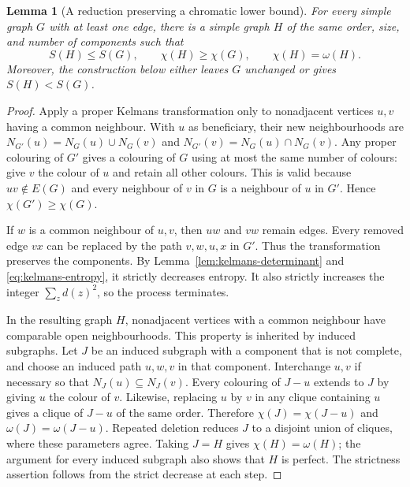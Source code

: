 \documentclass[11pt,a4paper,reqno]{amsart}
\newtheorem{lemma}[theorem]{Lemma}
\theoremstyle{remark}
\newcommand{\Ent}{S}
\numberwithin{equation}{section}
\begin{document}
\begin{lemma}[A reduction preserving a chromatic lower bound]
\label{lem:chromatic-reduction}
For every simple graph $G$ with at least one edge, there is a simple graph
$H$ of the same order, size, and number of components such that
\[
 \Ent(H)\le\Ent(G),\qquad
 \chi(H)\ge\chi(G),\qquad \chi(H)=\omega(H).
\]
Moreover, the construction below either leaves $G$ unchanged or gives
$\Ent(H)<\Ent(G)$.
\end{lemma}
\begin{proof}
Apply a proper Kelmans transformation only to nonadjacent vertices
$u,v$ having a common neighbour. With $u$ as beneficiary, their new
neighbourhoods are
$N_{G'}(u)=N_G(u)\cup N_G(v)$ and
$N_{G'}(v)=N_G(u)\cap N_G(v)$.
Any proper colouring of $G'$ gives a colouring of $G$ using at most the
same number of colours: give $v$ the colour of $u$ and retain all other
colours. This is valid because $uv\notin E(G)$ and every neighbour of
$v$ in $G$ is a neighbour of $u$ in $G'$. Hence $\chi(G')\ge\chi(G)$.

If $w$ is a common neighbour of $u,v$, then $uw$ and $vw$ remain edges.
Every removed edge $vx$ can be replaced by the path $v,w,u,x$ in $G'$.
Thus the transformation preserves the components. By
Lemma~\ref{lem:kelmans-determinant} and \eqref{eq:kelmans-entropy}, it
strictly decreases entropy. It also strictly increases the integer
$\sum_z d(z)^2$, so the process terminates.

In the resulting graph $H$, nonadjacent vertices with a common neighbour
have comparable open neighbourhoods. This property is inherited by
induced subgraphs. Let $J$ be an induced subgraph with a component that
is not complete, and choose an induced path $u,w,v$ in that component.
Interchange $u,v$ if necessary so that $N_J(u)\subseteq N_J(v)$.
Every colouring of $J-u$ extends to $J$ by giving $u$ the colour of $v$.
Likewise, replacing $u$ by $v$ in any clique containing $u$ gives
a clique of $J-u$ of the same order.
Therefore $\chi(J)=\chi(J-u)$ and $\omega(J)=\omega(J-u)$.
Repeated deletion reduces $J$ to a disjoint union of cliques, where
these parameters agree. Taking $J=H$ gives $\chi(H)=\omega(H)$;
the argument for every induced subgraph also shows that $H$ is perfect.
The strictness assertion follows from the strict decrease at each step.
\end{proof}
\end{document}
